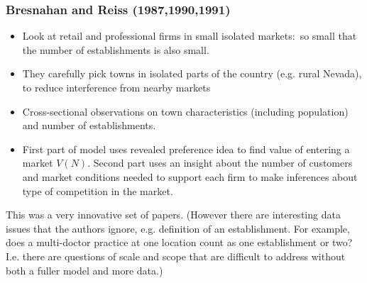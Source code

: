 \documentclass[notes=show]{beamer}
\begin{document}
\begin{frame}%

\frametitle{Bresnahan and Reiss (1987,1990,1991)}

\begin{itemize}
\item Look at retail and professional firms in small isolated markets:\ so
small that the number of establishments is also small.

\item They carefully pick towns in isolated parts of the country (e.g. rural
Nevada), to reduce interference from nearby markets

\item Cross-sectional observations on town characteristics (including
population) and number of establishments.

\item First part of model uses revealed preference idea to find value of
entering a market $V(N)$. Second part uses an insight about the number of
customers and market conditions needed to support each firm to make
inferences about type of competition in the market.
\end{itemize}

\bigskip

This was a very innovative set of papers. (However there are interesting
data issues that the authors ignore, e.g. definition of an establishment.
For example, does a multi-doctor practice at one location count as one
establishment or two? I.e. there are questions of scale and scope that are
difficult to address without both a fuller model and more data.)

\end{frame}%
\end{document}
